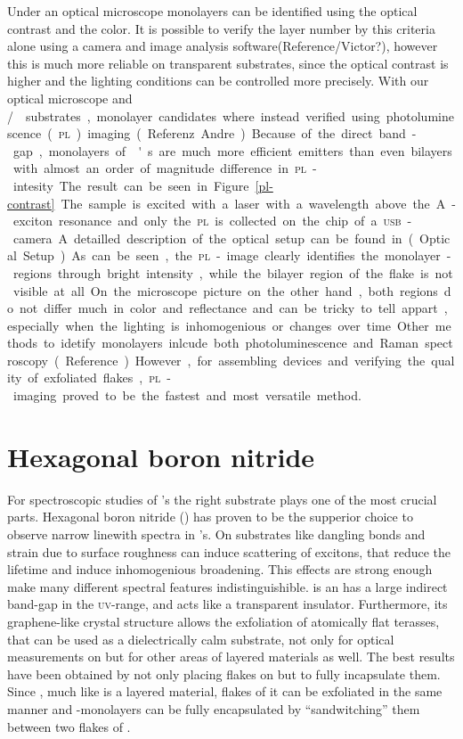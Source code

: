 Under an optical microscope monolayers can be identified using the optical contrast and the color. It is possible to verify the layer number by this criteria alone using a camera and image analysis software(Reference/Victor?), however this is much more reliable on transparent substrates, since the optical contrast is higher and the lighting conditions can be controlled more precisely. With our optical microscope and \si/\sio substrates, monolayer candidates where instead verified using photoluminescence (\textsc{pl}) imaging(Referenz Andre). Because of the direct band-gap, monolayers of \tmd's are much more efficient emitters than even bilayers with almost an order of magnitude difference in \textsc{pl}-intesity. The result can be seen in Figure \ref{pl-contrast}. The sample is excited with a laser with a wavelength above the A-exciton resonance and only the \textsc{pl} is collected on the chip of a \textsc{usb}-camera. A detailled description of the optical setup can be found in (Optical Setup). As can be seen, the \textsc{pl}-image clearly identifies the monolayer-regions through bright intensity, while the bilayer region of the flake is not visible at all. On the microscope picture on the other hand, both regions do not differ much in color and reflectance and can be tricky to tell appart, especially when the lighting is inhomogenious or changes over time.

Other methods to idetify monolayers inlcude both photoluminescence and Raman spectroscopy(Reference). However, for assembling devices and verifying the quality of exfoliated flakes, \textsc{pl}-imaging proved to be the fastest and most versatile method.

\section{Hexagonal boron nitride}

For spectroscopic studies of \tmd's the right substrate plays one of the most crucial parts. Hexagonal boron nitride (\hbn) has proven to be the supperior choice to observe narrow linewith spectra in \tmd's. On substrates like \sio dangling bonds and strain due to surface roughness can induce scattering of excitons, that reduce the lifetime and induce inhomogenious broadening. This effects are strong enough make many different spectral features indistinguishible. \hbn is an has a large indirect band-gap in the \textsc{uv}-range, and acts like a transparent insulator. Furthermore, its graphene-like crystal structure allows the exfoliation of atomically flat terasses, that can be used as a dielectrically calm substrate, not only for optical measurements on \tmds but for other areas of layered materials as well. The best results have been obtained by not only placing flakes on \hbn but to fully incapsulate them. Since \hbn, much like \tmds is a layered material, flakes of it can be exfoliated in the same manner and \tmd-monolayers can be fully encapsulated by ``sandwitching'' them between two flakes of \hbn.


